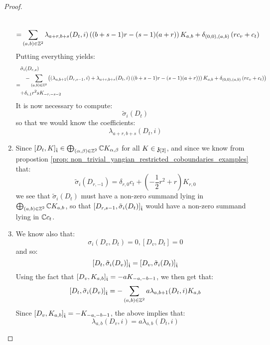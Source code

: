 \begin{proof}
\begin{enumerate}
$$\begin{aligned}
                                \\
                                = & \sum_{(a, b) \in \mathbb{Z}^2} \lambda_{a + r, b + s}(D_t, i) \left( (b + s - 1)r - (s - 1)(a + r) \right) K_{a, b} + \delta_{(0, 0), (a, b)} \left( r c_v + c_t \right)
                            \end{aligned}
                        $$
                    Putting everything yields:
                        $$
                            \begin{aligned}
                                & \tilde{\sigma}_i(D_{r, s})
                                \\
                                = &
                                \begin{aligned}
                                    & -\sum_{(a, b) \in \mathbb{Z}^2} \left(
                                        \left( \lambda_{a, b + 1}(D_{r, s - 1}, i) + \lambda_{a + r, b + s}(D_t, i) \left( (b + s - 1)r - (s - 1)(a + r) \right) \right) K_{a, b} + \delta_{(0, 0), (a, b)} \left( r c_v + c_t \right)
                                    \right)
                                    \\
                                    + & \delta_{i, 1} r^2 s K_{-r, -s - 2}
                                \end{aligned}
                            \end{aligned}
                        $$
                    It is now necessary to compute:
                        $$\tilde{\sigma}_i(D_t)$$
                    so that we would know the coefficients:
                        $$\lambda_{a + r, b + s}(D_t, i)$$
                    \item Since $[D_t, K]_{\hat{\mathfrak{t}}} \in \bigoplus_{(\alpha, \beta) \in \mathbb{Z}^2} \mathbb{C} K_{\alpha, \beta}$ for all $K \in \mathfrak{z}_{[2]}$, and since we know from propostion \ref{prop: non_trivial_yangian_restricted_coboundaries_examples} that:
                        $$\tilde{\sigma}_i(D_{r, -1}) = \delta_{r, 0} c_t + \left(-\frac12 r^2 + r\right) K_{r, 0}$$
                    we see that $\tilde{\sigma}_i(D_t)$ must have a non-zero summand lying in $\bigoplus_{(a, b) \in \mathbb{Z}^2} \mathbb{C} K_{a, b}$, so that $[D_{r, s - 1}, \tilde{\sigma}_i(D_t)]_{\hat{\mathfrak{t}}}$ would have a non-zero summand lying in $\mathbb{C} c_t$.

                    
                    \item We know also that:
                        $$\sigma_i(D_v, D_t) = 0, [D_v, D_t] = 0$$
                    and so:
                        $$[D_t, \tilde{\sigma}_i(D_v)]_{\hat{\mathfrak{t}}} = [D_v, \tilde{\sigma}_i(D_t)]_{\hat{\mathfrak{t}}}$$
                    Using the fact that $[D_v, K_{a, b}]_{\hat{\mathfrak{t}}} = -a K_{-a, -b - 1}$, we then get that:
                        $$[D_t, \tilde{\sigma}_i(D_v)]_{\hat{\mathfrak{t}}} = -\sum_{(a, b) \in \mathbb{Z}^2} a \lambda_{a, b + 1}(D_t, i) K_{a, b}$$
                    Since $[D_v, K_{a, b}]_{\hat{\mathfrak{t}}} = -K_{-a, -b - 1}$, the above implies that:
                        $$\lambda_{a, b}(D_v, i) = a\lambda_{a, b}(D_t, i)$$
                \end{enumerate}
            \end{proof}